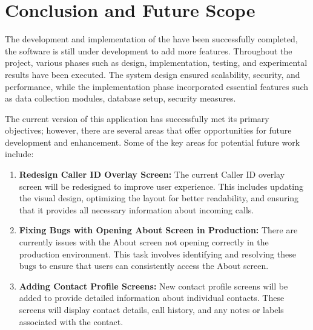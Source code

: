 \chapter{Conclusion and Future Scope}\label{ch:conclusion-and-future-scope}

The development and implementation of the {\myprojectname} have been successfully completed, the software is still under development to add more features.
Throughout the project, various phases such as design, implementation, testing, and experimental results have been executed.
The system design ensured scalability, security, and performance, while the implementation phase incorporated essential features such as data collection modules, database setup, security measures.

The current version of this application has successfully met its primary objectives; however, there are several areas that offer opportunities for future development and enhancement.
Some of the key areas for potential future work include:

\begin{enumerate}[label=\roman*.]
    \item \textbf{Redesign Caller ID Overlay Screen:}
    The current Caller ID overlay screen will be redesigned to improve user experience.
    This includes updating the visual design, optimizing the layout for better readability, and ensuring that it provides all necessary information about incoming calls.

    \item \textbf{Fixing Bugs with Opening About Screen in Production:}
    There are currently issues with the About screen not opening correctly in the production environment.
    This task involves identifying and resolving these bugs to ensure that users can consistently access the About screen.

    \item \textbf{Adding Contact Profile Screens:}
    New contact profile screens will be added to provide detailed information about individual contacts.
    These screens will display contact details, call history, and any notes or labels associated with the contact.

\end{enumerate}


